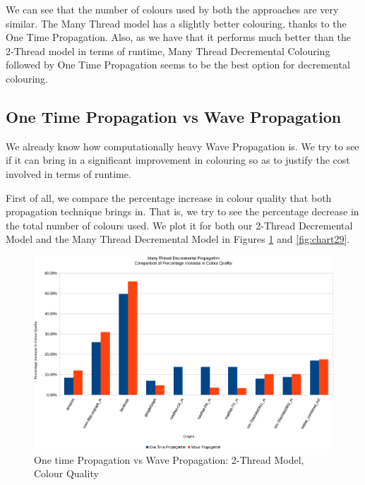 \documentclass[MTech]{iitmdiss}
\begin{document}
We can see that the number of colours used by both the approaches are very similar. The Many Thread model has a slightly better colouring, thanks to the One Time Propagation. Also, as we have that it performs much better than the 2-Thread model in terms of runtime, Many Thread Decremental Colouring followed by One Time Propagation seems to be the best option for decremental colouring.


\subsection{One Time Propagation vs Wave Propagation}
We already know how computationally heavy Wave Propagation is. We try to see if it can bring in a significant improvement in colouring so as to justify the cost involved in terms of runtime.

First of all, we compare the percentage increase in colour quality that both propagation technique brings in. That is, we try to see the percentage decrease in the total number of colours used. We plot it for both our 2-Thread Decremental Model and the Many Thread Decremental Model in Figures \ref{fig:chart28} and \ref{fig:chart29}.

\begin{figure}[h]
    \centering
    \includegraphics[width=\textwidth,keepaspectratio=true]{chartNewest30.pdf}
    \caption{
        One time Propagation vs Wave Propagation: 2-Thread Model, Colour Quality
    }
    \label{fig:chart28}
\end{figure}
\end{document}
